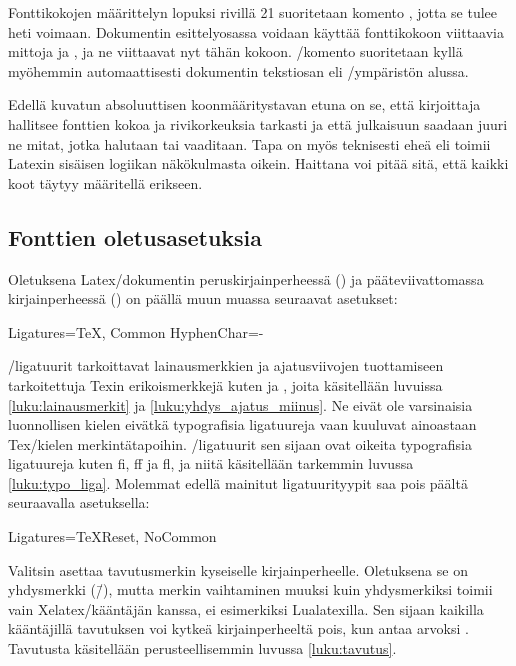Fonttikokojen määrittelyn lopuksi rivillä 21 suoritetaan komento
, jotta se tulee heti voimaan. Dokumentin
esittelyosassa voidaan käyttää fonttikokoon viittaavia mittoja
 ja , ja ne viittaavat nyt tähän kokoon.
\-/komento suoritetaan kyllä myöhemmin
automaattisesti dokumentin tekstiosan eli \-/ympäristön
alussa.

Edellä kuvatun absoluuttisen koonmääritystavan etuna on se, että
kirjoittaja hallitsee fonttien kokoa ja rivikorkeuksia tarkasti ja että
julkaisuun saadaan juuri ne mitat, jotka halutaan tai vaaditaan. Tapa on
myös teknisesti eheä eli toimii Latexin sisäisen logiikan näkökulmasta
oikein. Haittana voi pitää sitä, että kaikki koot täytyy määritellä
erikseen.

\subsection{Fonttien oletus\-asetuksia}

Oletuksena%
 Latex\-/dokumentin
peruskirjainperheessä () ja
pääteviivattomassa kirjainperheessä () on
päällä muun muassa seuraavat asetukset:%

\begin{koodilohkosis}
  Ligatures={TeX, Common}
  HyphenChar={-}
\end{koodilohkosis}

\-/ligatuurit tarkoittavat lainausmerkkien ja ajatusviivojen
tuottamiseen tarkoitettuja Texin erikoismerkkejä kuten  ja
\koodi{\==}, joita käsitellään luvuissa \ref{luku:lainausmerkit} ja
\ref{luku:yhdys_ajatus_miinus}. Ne eivät ole varsinaisia luonnollisen
kielen eivätkä typografisia ligatuureja vaan kuuluvat ainoastaan
Tex\-/kielen merkintätapoihin. \-/ligatuurit sen sijaan
ovat oikeita typografisia ligatuureja kuten fi, ff ja fl, ja niitä
käsitellään tarkemmin luvussa \ref{luku:typo_liga}. Molemmat edellä
mainitut ligatuurityypit saa pois päältä seuraavalla asetuksella:

\begin{koodilohkosis}
  Ligatures={TeXReset, NoCommon}
\end{koodilohkosis}

Valitsin  asettaa tavutusmerkin kyseiselle
kirjainperheelle. Oletuksena se on yhdysmerkki (\=/), mutta merkin
vaihtaminen muuksi kuin yhdysmerkiksi toimii vain Xelatex\-/kääntäjän
kanssa, ei esimerkiksi Lualatexilla. Sen sijaan kaikilla kääntäjillä
tavutuksen voi kytkeä kirjainperheeltä pois, kun antaa arvoksi
. Tavutusta käsitellään perusteellisemmin luvussa
\ref{luku:tavutus}.

